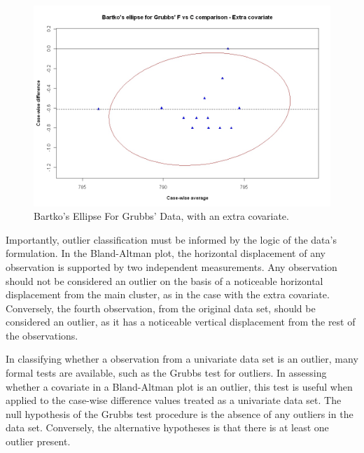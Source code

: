 \documentclass[Main.tex]{subfiles}
\begin{document}
	\begin{figure}[h!]
		\includegraphics[width=130mm]{images/GrubbsBartko2.jpeg}
		\caption{Bartko's Ellipse For Grubbs' Data, with an extra covariate.}\label{GrubbsBartko2}
	\end{figure}
	
	
	Importantly, outlier classification must be informed by the logic of the
	data's formulation. In the Bland-Altman plot, the horizontal displacement of any
	observation is supported by two independent measurements. Any
	observation should not be considered an outlier on the basis of a
	noticeable horizontal displacement from the main cluster, as in
	the case with the extra covariate. Conversely, the fourth
	observation, from the original data set, should be considered an
	outlier, as it has a noticeable vertical displacement from the
	rest of the observations.
	
	
	
	In classifying whether a observation from a univariate data set is
	an outlier, many formal tests are available, such as the Grubbs test for outliers. In assessing
	whether a covariate in a Bland-Altman plot is an outlier, this
	test is useful when applied to the case-wise difference values treated as a
	univariate data set. The null hypothesis of the Grubbs test procedure is the absence
	of any outliers in the data set. Conversely, the alternative hypotheses is that there is at least one outlier
	present.
	
\end{document}
